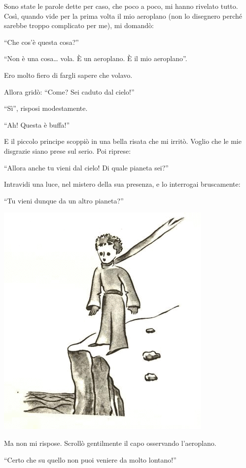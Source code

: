 \documentclass[11pt]{scrbook}
\begin{document}
Sono state le parole dette per caso, che poco a poco, mi hanno rivelato tutto. Così, quando vide per la prima volta il mio aeroplano (non lo disegnero perché sarebbe troppo complicato per me), mi domandò:

``Che cos'è questa cosa?''

``Non è una cosa\ldots{} vola. È un aeroplano. È il mio aeroplano''.

Ero molto fiero di fargli sapere che volavo.

Allora gridò: ``Come? Sei caduto dal cielo!''

``Sì'', risposi modestamente.

``Ah! Questa è buffa!''

E il piccolo principe scoppiò in una bella risata che mi irritò. Voglio che le mie disgrazie siano prese sul serio. Poi riprese:

``Allora anche tu vieni dal cielo! Di quale pianeta sei?''

Intravidi una luce, nel mistero della sua presenza, e lo interrogai bruscamente:

``Tu vieni dunque da un altro pianeta?''

\begin{center}
\includegraphics{img/3a}
\end{center}

Ma non mi rispose. Scrollò gentilmente il capo osservando l'aeroplano.

``Certo che su quello non puoi veniere da molto lontano!''
\end{document}
